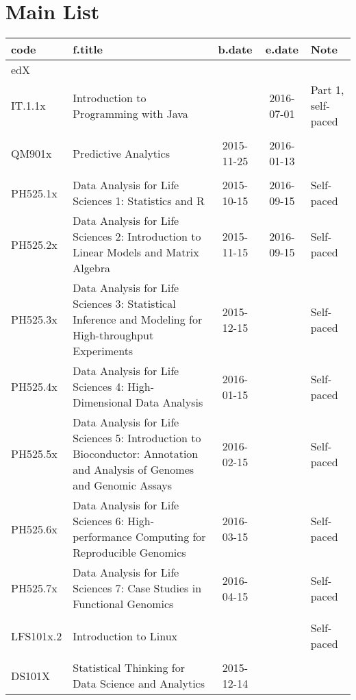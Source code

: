 \documentclass[a4paper,12pt]{article} %
\begin{document}
\tableofcontents

\newpage
\section{Main List}
\begin{longtable}{|l|p{6cm}|c|c|l|}
	\hline
	code & f.title & b.date & e.date & Note \\
	\hline
	\multicolumn{5}{|l|}{edX}\\
	\hline
	IT.1.1x & Introduction to Programming with Java &  & 2016-07-01 & Part 1, self-paced\\
	\hline
	&  &  &  &  \\
	\hline
	QM901x & Predictive Analytics & 2015-11-25 & 2016-01-13 &  \\
	\hline
	&  &  &  &  \\
	\hline
	PH525.1x & Data Analysis for Life Sciences 1: Statistics and R & 2015-10-15 & 2016-09-15 & Self-paced \\
	\hline
	PH525.2x & Data Analysis for Life Sciences 2: Introduction to Linear Models and Matrix Algebra & 2015-11-15 & 2016-09-15 & Self-paced \\
	\hline
	PH525.3x & Data Analysis for Life Sciences 3: Statistical Inference and Modeling for High-throughput Experiments & 2015-12-15 &  & Self-paced \\
	\hline
	PH525.4x & Data Analysis for Life Sciences 4: High-Dimensional Data Analysis & 2016-01-15 &  & Self-paced \\
	\hline
	PH525.5x & Data Analysis for Life Sciences 5: Introduction to Bioconductor: Annotation and Analysis of Genomes and Genomic Assays & 2016-02-15 &  & Self-paced \\
	\hline
	PH525.6x & Data Analysis for Life Sciences 6: High-performance Computing for Reproducible Genomics & 2016-03-15 &  & Self-paced \\
	\hline
	PH525.7x & Data Analysis for Life Sciences 7: Case Studies in Functional Genomics & 2016-04-15 &  & Self-paced \\
	\hline
	&  &  &  &  \\
	\hline
	LFS101x.2 & Introduction to Linux &  &  & Self-paced \\
	\hline
	&  &  &  &  \\
	\hline
	DS101X & Statistical Thinking for Data Science and Analytics & 2015-12-14 &  &  \\

\end{longtable}
\end{document}
